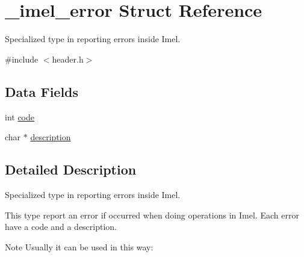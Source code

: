 \hypertarget{struct__imel__error}{}\section{\+\_\+imel\+\_\+error Struct Reference}
\label{struct__imel__error}


Specialized type in reporting errors inside Imel.  




{\ttfamily \#include $<$header.\+h$>$}

\subsection*{Data Fields}
{\bf }\par
\begin{DoxyCompactItemize}
\item 
int \hyperlink{struct__imel__error_a473e5bd44dd6abf7b40bff9e1b930bfa}{code}
\item 
char $\ast$ \hyperlink{struct__imel__error_aa5a783bee5d7d963d01e40f06dd3f772}{description}
\end{DoxyCompactItemize}



\subsection{Detailed Description}
Specialized type in reporting errors inside Imel. 

This type report an error if occurred when doing operations in Imel. Each error have a code and a description.

\begin{DoxyNote}{Note}
Usually it can be used in this way\+: 
 
\end{DoxyNote}


